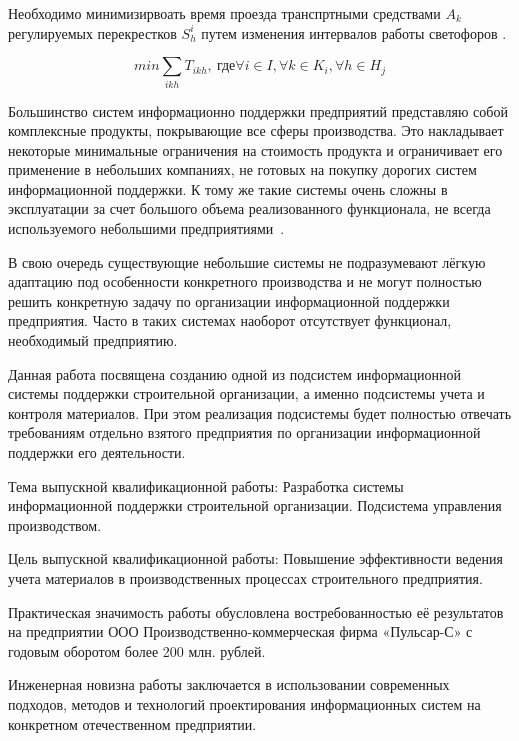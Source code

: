 \documentclass[a4paper,13pt]{article}
\begin{document}
Необходимо минимизирвоать время проезда транспртными средствами \begin{math}A_k\end{math} регулируемых перекрестков \begin{math}S^i_{h}\end{math} путем изменения интервалов работы светофоров .

\begin{equation}\label{eq:crosstime}
min \sum_{ikh} T_{ikh},\ \text{где} \forall i \in I, \forall k \in K_i, \forall h \in H_j
\end{equation}

Большинство систем информационно поддержки предприятий представляю собой комплексные продукты, покрывающие все сферы производства. Это накладывает некоторые минимальные ограничения на стоимость продукта и ограничивает его применение в небольших компаниях, не готовых на покупку дорогих систем информационной поддержки. К тому же такие системы очень сложны в эксплуатации за счет большого объема реализованного функционала, не всегда используемого небольшими предприятиями~\cite{pb}.

В свою очередь существующие небольшие системы не подразумевают лёгкую адаптацию под особенности конкретного производства и не могут полностью решить конкретную задачу по организации информационной поддержки предприятия. Часто в таких системах наоборот  отсутствует функционал, необходимый предприятию.

Данная работа посвящена созданию одной из подсистем информационной системы поддержки строительной организации, а именно подсистемы учета и контроля материалов. При этом реализация подсистемы будет полностью отвечать требованиям отдельно взятого предприятия по организации информационной поддержки его деятельности.

Тема выпускной квалификационной работы:  Разработка системы информационной поддержки строительной организации. Подсистема управления производством.

Цель выпускной квалификационной работы: Повышение эффективности ведения учета материалов в производственных процессах строительного предприятия. 

Практическая значимость работы обусловлена востребованностью её результатов на предприятии ООО Производственно-коммерческая фирма «Пульсар-С» с годовым оборотом более 200 млн. рублей.

Инженерная новизна работы заключается в использовании современных подходов, методов и технологий проектирования информационных систем на конкретном отечественном предприятии.
\end{document}
